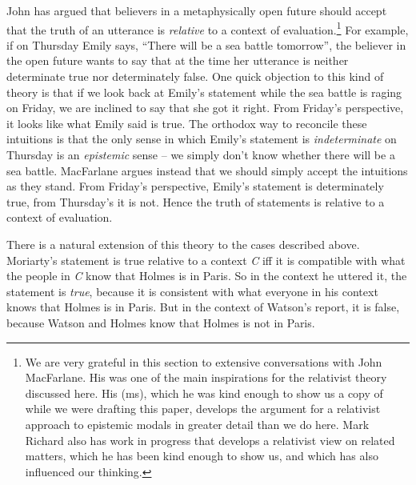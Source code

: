 John \citet{MacFarlane2003-MACFCA-2} has argued that believers in a metaphysically open future should accept that the truth of an utterance is \textit{relative} to a context of evaluation.\footnote{We are very grateful in this section to extensive conversations with John MacFarlane. His \citeyearpar{MacFarlane2003-MACFCA-2} was one of the main inspirations for the relativist theory discussed here. His (ms), which he was kind enough to show us a copy of while we were drafting this paper, develops the argument for a relativist approach to epistemic modals in greater detail than we do here. Mark Richard also has work in progress that develops a relativist view on related matters, which he has been kind enough to show us, and which has also influenced our thinking. } For example, if on Thursday Emily says, ``There will be a sea battle tomorrow'', the believer in the open future wants to say that at the time her utterance is neither determinate true nor determinately false. One quick objection to this kind of theory is that if we look back at Emily's statement while the sea battle is raging on Friday, we are inclined to say that she got it right. From Friday's perspective, it looks like what Emily said is true. The orthodox way to reconcile these intuitions is that the only sense in which Emily's statement is \textit{indeterminate} on Thursday is an \textit{epistemic} sense -- we simply don't know whether there will be a sea battle. MacFarlane argues instead that we should simply accept the intuitions as they stand. From Friday's perspective, Emily's statement is determinately true, from Thursday's it is not. Hence the truth of statements is relative to a context of evaluation.
 
There is a natural extension of this theory to the cases described above. Moriarty's statement is true relative to a context \textit{C} iff it is compatible with what the people in \textit{C} know that Holmes is in Paris. So in the context he uttered it, the statement is \textit{true}, because it is consistent with what everyone in his context knows that Holmes is in Paris. But in the context of Watson's report, it is false, because Watson and Holmes know that Holmes is not in Paris. 
 
